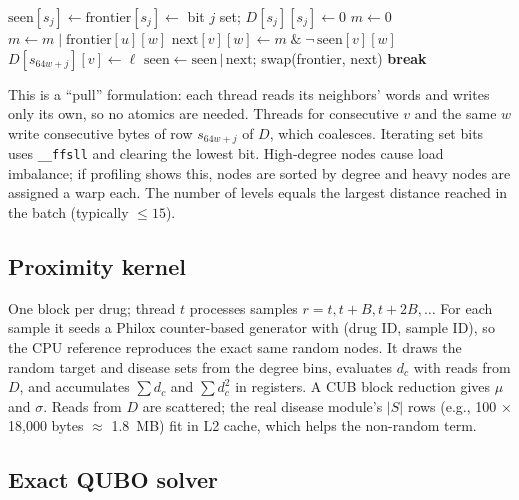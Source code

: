 \begin{algorithm}[h]
\caption{One batch of MS-BFS (sources $s_0,\dots,s_{64W-1}$)}
\begin{algorithmic}[1]
\State $\text{seen}[s_j] \gets \text{frontier}[s_j] \gets$ bit $j$ set; $D[s_j][s_j]\gets 0$
   
    \State $m \gets 0$
     \State $m \gets m \;|\; \text{frontier}[u][w]$ \EndFor
    \State $\text{next}[v][w] \gets m \;\&\; \lnot\,\text{seen}[v][w]$
     \State $D[s_{64w+j}][v] \gets \ell$ \EndFor
  \EndFor
  \State $\text{seen} \gets \text{seen} \,|\, \text{next}$;\; swap(frontier, next)
   \textbf{break} \EndIf
\EndFor
\end{algorithmic}
\end{algorithm}

This is a ``pull'' formulation: each thread reads its neighbors' words and
writes only its own, so no atomics are needed. Threads for consecutive $v$
and the same $w$ write consecutive bytes of row $s_{64w+j}$ of $D$, which
coalesces. Iterating set bits uses \texttt{\_\_ffsll} and clearing the lowest
bit. High-degree nodes cause load imbalance; if profiling shows this, nodes
are sorted by degree and heavy nodes are assigned a warp each. The number of
levels equals the largest distance reached in the batch (typically
$\le 15$).

\subsection{Proximity kernel}

One block per drug; thread $t$ processes samples $r = t, t+B, t+2B,\dots$ For
each sample it seeds a Philox counter-based generator with (drug ID, sample
ID), so the CPU reference reproduces the exact same random nodes. It draws
the random target and disease sets from the degree bins, evaluates $d_c$ with
reads from $D$, and accumulates $\sum d_c$ and $\sum d_c^2$ in registers. A
CUB block reduction gives $\mu$ and $\sigma$. Reads from $D$ are scattered;
the real disease module's $|S|$ rows (e.g., 100 $\times$ 18{,}000 bytes
$\approx$ 1.8~MB) fit in L2 cache, which helps the non-random term.

\subsection{Exact QUBO solver}

